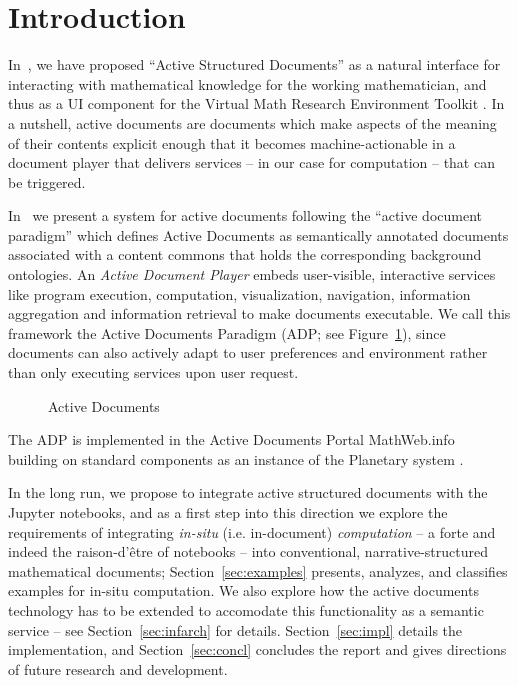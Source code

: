 \section{Introduction}\label{sec:intro}

In~, we have proposed ``Active Structured Documents'' as a natural interface for interacting
with mathematical knowledge for the working mathematician, and thus as a UI component for
the \pn Virtual Math Research Environment Toolkit .
%
In a nutshell, active documents are documents which make aspects of the meaning of their
contents explicit enough that it becomes machine-actionable in a document player that
delivers services -- in our case for computation -- that can be triggered.

In~\cite{KohDavGin:psewads11} we present a system for active documents following the
``active document paradigm'' which defines Active Documents as semantically annotated
documents associated with a content commons that holds the corresponding background
ontologies. An \textit{Active Document Player} embeds user-visible, interactive services
like program execution, computation, visualization, navigation, information aggregation
and information retrieval to make documents executable. We call this framework the Active
Documents Paradigm (ADP; see Figure~\ref{fig:activedocs}), since documents can also
actively adapt to user preferences and environment rather than only executing services
upon user request.
\begin{figure}[ht]\centering
  
  \caption{Active Documents}\label{fig:activedocs} 
\end{figure} 

The ADP is implemented in the Active Documents Portal MathWeb.info~\cite{MathHub:on}
building on standard components as an instance of the Planetary system
\cite{Kohlhase:ppte12}.

In the long run, we propose to integrate active structured documents with the Jupyter
notebooks, and as a first step into this direction we explore the requirements of
integrating \emph{in-situ} (i.e. in-document) \emph{computation} -- a forte and indeed
the raison-d'être of notebooks -- into conventional, narrative-structured mathematical
documents; Section~\ref{sec:examples} presents, analyzes, and classifies examples for
in-situ computation.  We also explore how the active documents technology has to be
extended to accomodate this functionality as a semantic service -- see
Section~\ref{sec:infarch} for details. Section~\ref{sec:impl} details the implementation,
and Section~\ref{sec:concl} concludes the report and gives directions of future research
and development.


